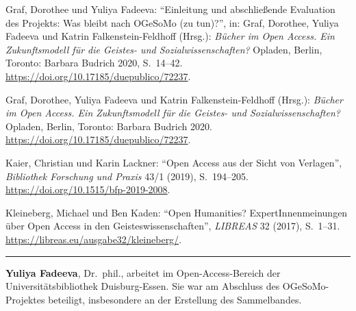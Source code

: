 \documentclass[a4paper,
fontsize=11pt,
oneside,
numbers=noperiodatend,
parskip=half-,
bibliography=totoc,
final
]{scrartcl}
\begin{document}
Graf, Dorothee und Yuliya Fadeeva: \enquote{Einleitung und abschließende
Evaluation des Projekts: Was bleibt nach OGeSoMo (zu tun)?}, in: Graf,
Dorothee, Yuliya Fadeeva und Katrin Falkenstein-Feldhoff (Hrsg.):
\emph{Bücher im Open Access. Ein Zukunftsmodell für die Geistes- und
Sozialwissenschaften?} Opladen, Berlin, Toronto: Barbara Budrich 2020,
S.~14--42. \href{https://doi.org/10.17185/duepublico/72237}{https://doi.org/10.17185/due\-publico/72237}.

Graf, Dorothee, Yuliya Fadeeva und Katrin Falkenstein-Feldhoff (Hrsg.):
\emph{Bücher im Open Access. Ein Zukunftsmodell für die Geistes- und
Sozialwissenschaften?} Opladen, Berlin, Toronto: Barbara Budrich 2020.
\url{https://doi.org/10.17185/duepublico/72237}.

Kaier, Christian und Karin Lackner: \enquote{Open Access aus der Sicht von
Verlagen}, \emph{Bibliothek Forschung und Praxis} 43/1 (2019),
S.~194--205. \url{https://doi.org/10.1515/bfp-2019-2008}.

Kleineberg, Michael und Ben Kaden: \enquote{Open Humanities?
ExpertInnenmeinungen über Open Access in den Geisteswissenschaften},
\emph{LIBREAS} 32 (2017), S.~1--31.
\url{https://libreas.eu/ausgabe32/kleineberg/}.

\begin{center}\rule{0.5\linewidth}{0.5pt}\end{center}

\textbf{Yuliya Fadeeva}, Dr.~phil., arbeitet im Open-Access-Bereich der
Universitätsbibliothek Duisburg-Essen. Sie war am Abschluss des
OGeSoMo-Projektes beteiligt, insbesondere an der Erstellung des
Sammelbandes.
\end{document}
